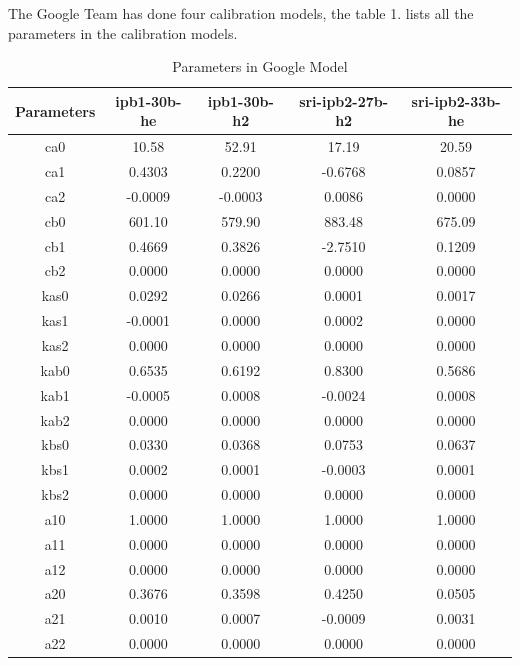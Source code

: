 \documentclass{article}
\begin{document}
The Google Team has done four calibration models, the table 1. lists all the parameters in the calibration models.
\begin{table}[h]
\centering
\caption{Parameters in Google Model}

\begin{tabular}{|c|c|c|c|c|}
\hline
Parameters & ipb1-30b-he & ipb1-30b-h2 & sri-ipb2-27b-h2 & sri-ipb2-33b-he\\ \hline
ca0	&	10.58	&	52.91	&	17.19	&	20.59	\\	\hline
ca1	&	0.4303	&	0.2200	&	-0.6768	&	0.0857	\\	\hline
ca2	&	-0.0009	&	-0.0003	&	0.0086	&	0.0000	\\	\hline
cb0	&	601.10	&	579.90	&	883.48	&	675.09	\\	\hline
cb1	&	0.4669	&	0.3826	&	-2.7510	&	0.1209	\\	\hline
cb2	&	0.0000	&	0.0000	&	0.0000	&	0.0000	\\	\hline
kas0	&	0.0292	&	0.0266	&	0.0001	&	0.0017	\\	\hline
kas1	&	-0.0001	&	0.0000	&	0.0002	&	0.0000	\\	\hline
kas2	&	0.0000	&	0.0000	&	0.0000	&	0.0000	\\	\hline
kab0	&	0.6535	&	0.6192	&	0.8300	&	0.5686	\\	\hline
kab1	&	-0.0005	&	0.0008	&	-0.0024	&	0.0008	\\	\hline
kab2	&	0.0000	&	0.0000	&	0.0000	&	0.0000	\\	\hline
kbs0	&	0.0330	&	0.0368	&	0.0753	&	0.0637	\\	\hline
kbs1	&	0.0002	&	0.0001	&	-0.0003	&	0.0001	\\	\hline
kbs2	&	0.0000	&	0.0000	&	0.0000	&	0.0000	\\	\hline
a10	&	1.0000	&	1.0000	&	1.0000	&	1.0000	\\	\hline
a11	&	0.0000	&	0.0000	&	0.0000	&	0.0000	\\	\hline
a12	&	0.0000	&	0.0000	&	0.0000	&	0.0000	\\	\hline
a20	&	0.3676	&	0.3598	&	0.4250	&	0.0505	\\	\hline
a21	&	0.0010	&	0.0007	&	-0.0009	&	0.0031	\\	\hline
a22	&	0.0000	&	0.0000	&	0.0000	&	0.0000	\\	\hline

\end{tabular}
\end{table}
\end{document}
